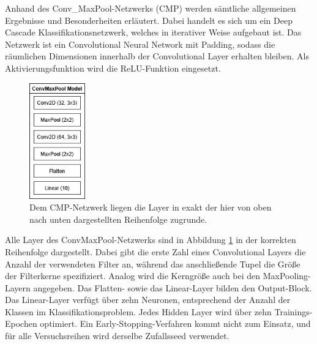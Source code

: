 Anhand des Conv\_MaxPool-Netzwerks (CMP) werden sämtliche allgemeinen Ergebnisse und Besonderheiten erläutert. Dabei handelt es sich um ein Deep 
Cascade Klassifikationsnetzwerk, welches in iterativer Weise aufgebaut ist. Das Netzwerk ist ein Convolutional Neural Network mit Padding, 
sodass die räumlichen Dimensionen innerhalb der Convolutional Layer erhalten bleiben. Als Aktivierungsfunktion wird die ReLU-Funktion 
eingesetzt.

\begin{figure}[htpb]
    \centering
    \includegraphics[height=5cm]{../../Graphiken/convmaxpool.png}
    \caption{\label{fig:convmaxpool} 
    \small{Dem CMP-Netzwerk liegen die Layer in exakt der hier von oben nach unten dargestellten Reihenfolge zugrunde.}}
\end{figure}

Alle Layer des ConvMaxPool-Netzwerks sind in Abbildung \ref{fig:convmaxpool} in der korrekten Reihenfolge dargestellt. Dabei gibt die erste 
Zahl eines Convolutional Layers die Anzahl der verwendeten Filter an, während das anschließende Tupel die Größe der Filterkerne spezifiziert. 
Analog wird die Kerngröße auch bei den MaxPooling-Layern angegeben. Das Flatten- sowie das Linear-Layer bilden den Output-Block. Das 
Linear-Layer verfügt über zehn Neuronen, entsprechend der Anzahl der Klassen im Klassifikationsproblem. Jedes Hidden Layer wird über zehn 
Trainings-Epochen optimiert. Ein Early-Stopping-Verfahren kommt nicht zum Einsatz, und für alle Versuchsreihen wird derselbe Zufallsseed 
verwendet.
